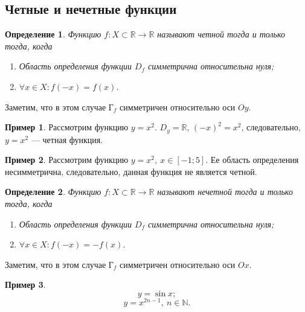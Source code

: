 \documentclass[a4paper,12pt]{article} %
\newtheorem{definition}{Определение}[section]
\theoremstyle{remark}
\theoremstyle{definition}
\newtheorem{exmp}{Пример}[section]
\begin{document}
\subsection{Четные и нечетные функции}
\begin{definition}
    Функцию $f : X\subset \mathbb{R}\to \mathbb{R}$ называют четной тогда и только тогда, когда
    \begin{enumerate}
        \item Область определения функции $D_f$ симметрична относительна нуля;
        \item $\forall x \in X : f(-x) = f(x)$.
    \end{enumerate}
\end{definition}
\noindent Заметим, что в этом случае Г$_f$ симметричен относительно оси $Oy$.
\begin{exmp}
    Рассмотрим функцию $y = x^2$. $D_y=\mathbb{R}$, $(-x)^2 = x^2$, следовательно, $y = x^2$ --- четная функция.
\end{exmp}
\begin{exmp}
    Рассмотрим функцию $y=x^2, \ x\in [-1; 5]$. Ее область определения несимметрична,
    следовательно, данная функция не является четной.
\end{exmp}

\begin{definition}
    Функцию $f : X\subset \mathbb{R}\to \mathbb{R}$ называют нечетной тогда и только тогда, когда
    \begin{enumerate}
        \item Область определения функции $D_f$ симметрична относительна нуля;
        \item $\forall x \in X : f(-x) = -f(x)$.
    \end{enumerate}
\end{definition}
\noindent Заметим, что в этом случае Г$_f$ симметричен относительно оси $Ox$.
\begin{exmp}
    \[y = \sin x;\] 
    \[y = x^{2n - 1}, \ n \in \mathbb{N}.\] 
\end{exmp}
\end{document}

